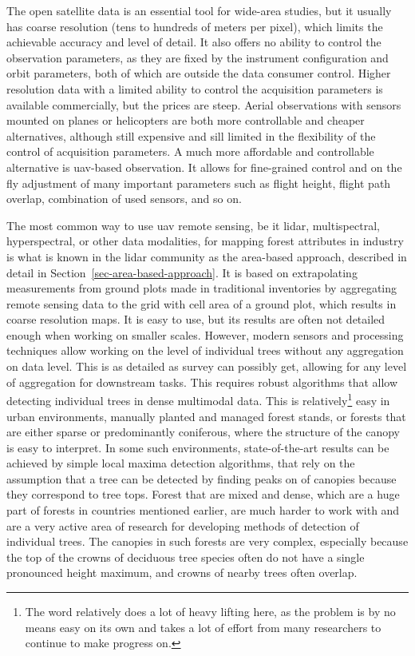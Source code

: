 The open satellite data is an essential tool for wide-area studies, but it usually has coarse resolution (tens to hundreds of meters per pixel), which limits the achievable accuracy and level of detail.
It also offers no ability to control the observation parameters, as they are fixed by the instrument configuration and orbit parameters, both of which are outside the data consumer control.
Higher resolution data with a limited ability to control the acquisition parameters is available commercially, but the prices are steep.
Aerial observations with sensors mounted on planes or helicopters are both more controllable and cheaper alternatives, although still expensive and sill limited in the flexibility of the control of acquisition parameters.
A much more affordable and controllable alternative is \gls{uav}-based observation.
It allows for fine-grained control and on the fly adjustment of many important parameters such as flight height, flight path overlap, combination of used sensors, and so on.

The most common way to use \gls{uav} remote sensing, be it \gls{lidar}, multispectral, hyperspectral, or other data modalities, for mapping forest attributes in industry is what is known in the \gls{lidar} community as the area-based approach, described in detail in Section~\ref{sec-area-based-approach}.
It is based on extrapolating measurements from ground plots made in traditional inventories by aggregating remote sensing data to the grid with cell area of a ground plot, which results in coarse resolution maps.
It is easy to use, but its results are often not detailed enough when working on smaller scales.
However, modern sensors and processing techniques allow working on the level of individual trees without any aggregation on data level.
This is as detailed as survey can possibly get, allowing for any level of aggregation for downstream tasks.
This requires robust algorithms that allow detecting individual trees in dense multimodal data.
This is relatively\footnote{The word relatively does a lot of heavy lifting here, as the problem is by no means easy on its own and takes a lot of effort from many researchers to continue to make progress on.
} easy in urban environments, manually planted and managed forest stands, or forests that are either sparse or predominantly coniferous, where the structure of the canopy is easy to interpret.
In some such environments, state-of-the-art results can be achieved by simple local maxima detection algorithms, that rely on the assumption that a tree can be detected by finding peaks on of canopies because they correspond to tree tops.
Forest that are mixed and dense, which are a huge part of forests in countries mentioned earlier, are much harder to work with and are a very active area of research for developing methods of detection of individual trees.
The canopies in such forests are very complex, especially because the top of the crowns of deciduous tree species often do not have a single pronounced height maximum, and crowns of nearby trees often overlap.

